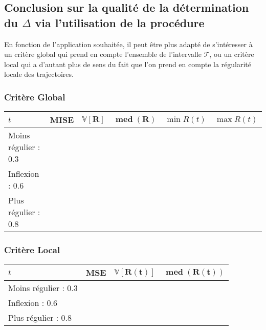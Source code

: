 \subsection{Conclusion sur la qualité de la détermination du $\Delta$ via l'utilisation de la procédure}

En fonction de l'application souhaitée, il peut être plus adapté de s'intéresser à un critère global qui prend en compte l'ensemble de l'intervalle $\mathcal T$, ou un critère local qui a d'autant plus de sens du fait que l'on prend en compte la régularité locale des trajectoires.

\subsubsection{Critère Global}

\begin{table}[H]
\centering
\begin{tabularx}{\textwidth}{|l|X|X|X|X|X|}
	\toprule
	$t$                  & \textbf{MISE} & $\mathbf{\mathds V[R]}$ & $\mathbf{\operatorname{med}(R)}$ & $\min R(t)$ & $\max R(t)$\\
	\midrule
	Moins régulier : 0.3 &              &                            & & &
	\\
	Inflexion : 0.6      &              &                            & & &
	\\
	Plus régulier : 0.8  &              &                            & & &
	\\
	\bottomrule
\end{tabularx}
\end{table}

\subsubsection{Critère Local}

\begin{table}[H]
\centering
\begin{tabularx}{\textwidth}{|l|X|X|X|}
  \toprule
  $t$ &\textbf{MSE} & $\mathbf{\mathds V[R(t)]}$ & $\mathbf{\operatorname{med}(R(t))}$ \\
  \midrule
  Moins régulier : 0.3  & & & 
  \\
  Inflexion : 0.6       & & &
  \\
  Plus régulier : 0.8   & & &
  \\
  \bottomrule
\end{tabularx}
\end{table}

